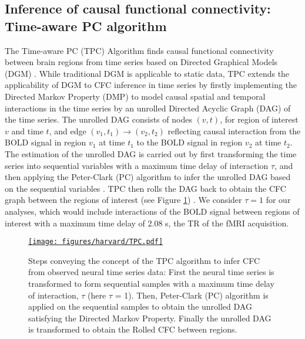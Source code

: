 \documentclass[12pt,reqno]{amsart}
\theoremstyle{definition}
\begin{document}
\subsection{Inference of causal functional connectivity: Time-aware PC algorithm}
The Time-aware PC (TPC) Algorithm finds causal functional connectivity between brain regions from time series based on Directed Graphical Models (DGM) \citep{spirtes2000causation, pearl2009causality, biswas2021statistical,biswas2022statistical2, biswas2022consistent}. While traditional DGM is applicable to static data, TPC extends the applicability of DGM to CFC inference in time series by firstly implementing the Directed Markov Property (DMP) to model causal spatial and temporal interactions in the time series by an unrolled Directed Acyclic Graph (DAG) of the time series. The unrolled DAG consists of nodes $(v,t)$, for region of interest $v$ and time $t$, and edge $(v_1,t_1)\rightarrow (v_2,t_2)$ reflecting causal interaction from the BOLD signal in region $v_1$ at time $t_1$ to the BOLD signal in region $v_2$ at time $t_2$. The estimation of the unrolled DAG is carried out by first transforming the time series into sequential variables with a maximum time delay of interaction $\tau$, and then applying the Peter-Clark (PC) algorithm to infer the unrolled DAG based on the sequential variables \citep{kalisch2007estimating}. TPC then rolls the DAG back to obtain the CFC graph between the regions of interest (see Figure \ref{fig:tpc}) \citep{biswas2022statistical2}. We consider $\tau = 1$ for our analyses, which would include interactions of the BOLD signal between regions of interest with a maximum time delay of 2.08 s, the TR of the fMRI acquisition.

\begin{figure}[t!]
    \centering
    \href{https://drive.google.com/file/d/1XiJY9c74TtfbDYphwwKVtMjPEo02_hhE/view?usp=sharing}{\texttt{[image: figures/harvard/TPC.pdf]}}
    \caption{Steps conveying the concept of the TPC algorithm to infer CFC from observed neural time series data: First the neural time series is transformed to form sequential samples with a maximum time delay of interaction, $\tau$ (here $\tau$ = 1). Then, Peter-Clark (PC) algorithm is applied on the sequential samples to obtain the unrolled DAG satisfying the Directed Markov Property. Finally the unrolled DAG is transformed to obtain the Rolled CFC between regions.}
    \label{fig:tpc}
\end{figure}
\end{document}
